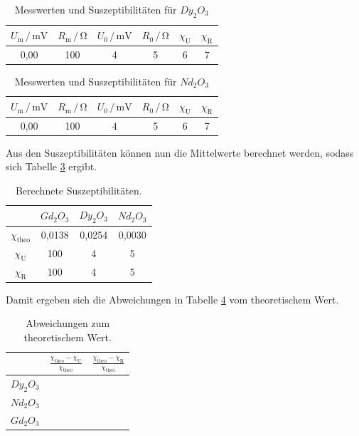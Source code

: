 \begin{table}
\centering
\caption{Messwerten und Suszeptibilitäten für $Dy_2O_3$}
\label{tab:Messdaten4}
\begin{tabular}{c c c c c c}
\toprule
$U_\text{m} \,/\, \si{\milli\volt}$ & $R_\text{m} \,/\, \si{\ohm}$ & $U_\text{0} \,/\, \si{\milli\volt}$& $R_\text{0} \,/\, \si{\ohm}$ & $\chi _\text{U}$ & $\chi _\text{R}$ \\
\midrule
0,00 & 100 & 4 & 5 & 6 & 7\\
\bottomrule
\end{tabular}
\end{table}

\begin{table}
\centering
\caption{Messwerten und Suszeptibilitäten für $Nd_2O_3$}
\label{tab:Messdaten5}
\begin{tabular}{c c c c c c}
\toprule
$U_\text{m} \,/\, \si{\milli\volt}$ & $R_\text{m} \,/\, \si{\ohm}$ & $U_\text{0} \,/\, \si{\milli\volt}$& $R_\text{0} \,/\, \si{\ohm}$ & $\chi _\text{U}$ & $\chi _\text{R}$ \\
\midrule
0,00 & 100 & 4 & 5 & 6 & 7\\
\bottomrule
\end{tabular}
\end{table}

Aus den Suszeptibilitäten können nun die Mittelwerte berechnet werden, 
sodass sich Tabelle \ref{tab:Messdaten6} ergibt. 

\begin{table}
\centering
\caption{Berechnete Suszeptibilitäten.}
\label{tab:Messdaten6}
\begin{tabular}{c c c c}
\toprule
& $Gd_2O_3$ & $Dy_2O_3$ & $Nd_2O_3$ \\
\midrule
$\chi_\text{theo}$ & 0,0138 & 0,0254 & 0,0030\\
$\chi_\text{U}$ & 100 & 4 & 5\\
$\chi_\text{R}$ & 100 & 4 & 5\\
\bottomrule
\end{tabular}
\end{table}

Damit ergeben sich die Abweichungen in Tabelle \ref{tab:Messdaten7} vom theoretischem 
Wert. 

\begin{table}
\centering
\caption{Abweichungen zum theoretischem Wert.}
\label{tab:Messdaten7}
\begin{tabular}{c c c}
\toprule
& $\frac{\chi_\text{theo}-\chi_\text{U}}{\chi_\text{theo}}$ 
& $\frac{\chi_\text{theo}-\chi_\text{R}}{\chi_\text{theo}}$\\
\midrule
$Dy_2O_3$ & & \\
$Nd_2O_3$ & & \\
$Gd_2O_3$ & & \\
\bottomrule
\end{tabular}
\end{table}

